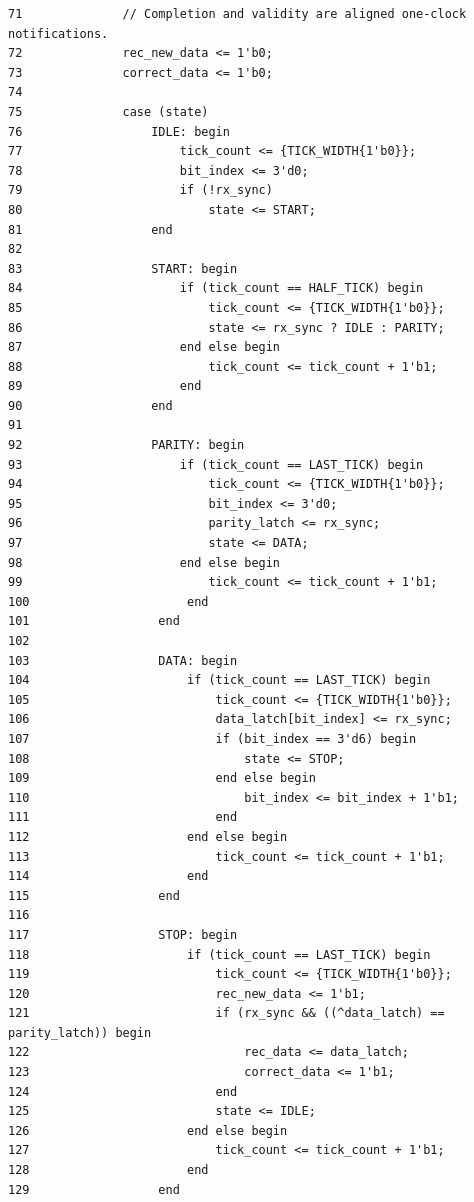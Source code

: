 \begin{dsdlcodeblock}
\begin{verbatim}
71              // Completion and validity are aligned one-clock notifications.
72              rec_new_data <= 1'b0;
73              correct_data <= 1'b0;
74
75              case (state)
76                  IDLE: begin
77                      tick_count <= {TICK_WIDTH{1'b0}};
78                      bit_index <= 3'd0;
79                      if (!rx_sync)
80                          state <= START;
81                  end
82
83                  START: begin
84                      if (tick_count == HALF_TICK) begin
85                          tick_count <= {TICK_WIDTH{1'b0}};
86                          state <= rx_sync ? IDLE : PARITY;
87                      end else begin
88                          tick_count <= tick_count + 1'b1;
89                      end
90                  end
91
92                  PARITY: begin
93                      if (tick_count == LAST_TICK) begin
94                          tick_count <= {TICK_WIDTH{1'b0}};
95                          bit_index <= 3'd0;
96                          parity_latch <= rx_sync;
97                          state <= DATA;
98                      end else begin
99                          tick_count <= tick_count + 1'b1;
100                      end
101                  end
102
103                  DATA: begin
104                      if (tick_count == LAST_TICK) begin
105                          tick_count <= {TICK_WIDTH{1'b0}};
106                          data_latch[bit_index] <= rx_sync;
107                          if (bit_index == 3'd6) begin
108                              state <= STOP;
109                          end else begin
110                              bit_index <= bit_index + 1'b1;
111                          end
112                      end else begin
113                          tick_count <= tick_count + 1'b1;
114                      end
115                  end
116
117                  STOP: begin
118                      if (tick_count == LAST_TICK) begin
119                          tick_count <= {TICK_WIDTH{1'b0}};
120                          rec_new_data <= 1'b1;
121                          if (rx_sync && ((^data_latch) == parity_latch)) begin
122                              rec_data <= data_latch;
123                              correct_data <= 1'b1;
124                          end
125                          state <= IDLE;
126                      end else begin
127                          tick_count <= tick_count + 1'b1;
128                      end
129                  end
\end{verbatim}
\end{dsdlcodeblock}

